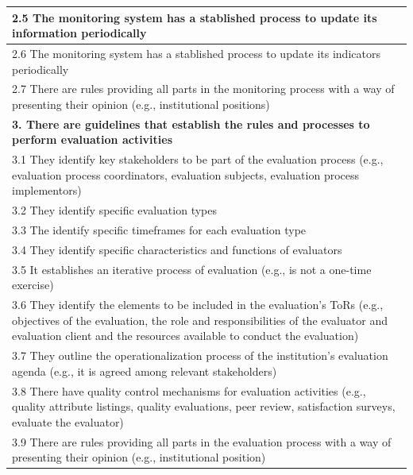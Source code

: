 \documentclass[
  10pt,
]{book}
\begin{document}
\begin{table}
\begin{tabular}[t]{l}
\hline
\hspace{1em}2.5 The monitoring system has a stablished process to update its information periodically\\
\hline
\hspace{1em}2.6 The monitoring system has a stablished process to update its indicators periodically\\
\hline
\hspace{1em}2.7 There are rules providing all parts in the monitoring process with a way of presenting their opinion (e.g., institutional positions)\\
\hline
\multicolumn{1}{l}{\textbf{3. There are guidelines that establish the rules and processes to perform evaluation activities}}\\
\hline
\hspace{1em}3.1 They identify key stakeholders to be part of the evaluation process (e.g., evaluation process coordinators, evaluation subjects, evaluation process implementors)\\
\hline
\hspace{1em}3.2 They identify specific evaluation types\\
\hline
\hspace{1em}3.3 The identify specific timeframes for each evaluation type\\
\hline
\hspace{1em}3.4 They identify specific characteristics and functions of evaluators\\
\hline
\hspace{1em}3.5 It establishes an iterative process of evaluation (e.g.,  is not a one-time exercise)\\
\hline
\hspace{1em}3.6 They identify the elements to be included in the evaluation's ToRs (e.g., objectives of the evaluation, the role and responsibilities of the evaluator and evaluation client and the resources available to conduct the evaluation)\\
\hline
\hspace{1em}3.7 They outline the operationalization process of the institution’s evaluation agenda (e.g., it is agreed among relevant stakeholders)\\
\hline
\hspace{1em}3.8 There have quality control mechanisms for evaluation activities (e.g., quality attribute listings, quality evaluations, peer review, satisfaction surveys, evaluate the evaluator)\\
\hline
\hspace{1em}3.9 There are rules providing all parts in the evaluation process with a way of presenting their opinion (e.g., institutional position)\\

\end{tabular}
\end{table}
\end{document}
